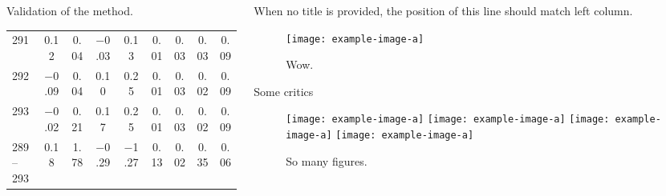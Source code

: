 \begin{frame}[t]
\begin{columns}[t]
\begin{column}{\colwidth}
\begin{block}{Validation of the method.}
\begin{table}
\begin{center}
\begin{tabular}{@{} l c c c c c c c c @{}}
							291           & \alert{\num{ 0.12}}                                                   & \alert{\num{0.04}}               & \num{-0.03}                    & \num{0.13}                       & \num{0.01}         & \num{0.03}         & \num{0.03}         & \num{0.09}         \\
							292           & \alert{\num{-0.09}}                                                   & \alert{\num{0.04}}               & \num{ 0.10}                    & \num{0.25}                       & \num{0.01}         & \num{0.03}         & \num{0.02}         & \num{0.09}         \\
							293           & \num{-0.02}                                                           & \num{0.21}                       & \num{ 0.17}                    & \num{0.25}                       & \num{0.01}         & \num{0.03}         & \num{0.02}         & \num{0.09}         \\
							289--293      & \num{ 0.18}                                                           & \num{1.78}                       & \num{-0.29}                    & \num{-1.27}                      & \alert{\num{0.13}} & \alert{\num{0.02}} & \alert{\num{0.35}} & \alert{\num{0.06}} \\
							\bottomrule
						\end{tabular}
					\end{center}
				\end{table}
			\end{block}

		\end{column}
		\separatorcolumn
		\begin{column}{\colwidth}
			\begin{block}{}
				When no title is provided, the position of this line should match left column.
				\begin{figure}
					\centering
					\texttt{[image: example-image-a]}
					\caption{%
						Wow.
					}
				\end{figure}
			\end{block}

			\begin{block}{Some critics}
				\begin{figure}
					\centering
					\texttt{[image: example-image-a]}
					\texttt{[image: example-image-a]}
					\texttt{[image: example-image-a]}
					\texttt{[image: example-image-a]}
					\caption{%
						So many figures.
					}
				\end{figure}


\end{block}
\end{column}
\end{columns}
\end{frame}
